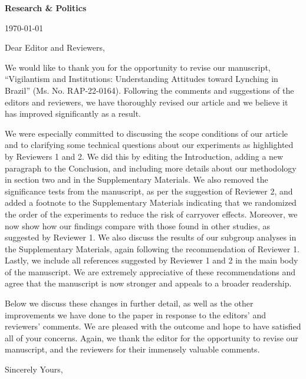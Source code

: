 \documentclass[a4paper,12pt]{article}
\begin{document}
\doublespacing

\noindent \textbf{Research \& Politics}

\noindent \today 

\vspace{.5cm}

\noindent Dear Editor and Reviewers,

\vspace{.5cm}

We would like to thank you for the opportunity to revise our manuscript,
``Vigilantism and Institutions: Understanding Attitudes toward Lynching in
Brazil'' (Ms. No. RAP-22-0164). Following the comments and suggestions of the
editors and reviewers, we have thoroughly revised our article and we believe it
has improved significantly as a result. 

We were especially committed to discussing the scope conditions of our article
and to clarifying some technical questions about our experiments as highlighted
by Reviewers 1 and 2. We did this by editing the Introduction, adding a new
paragraph to the Conclusion, and including more details about our methodology
in section two and in the Supplementary Materials. We also removed the
significance tests from the manuscript, as per the suggestion of Reviewer 2,
and added a footnote to the Supplementary Materials indicating that we
randomized the order of the experiments to reduce the risk of carryover
effects. Moreover, we now show how our findings compare with those found in
other studies, as suggested by Reviewer 1. We also discuss the results of our
subgroup analyses in the Supplementary Materials, again following the
recommendation of Reviewer 1. Lastly, we include all references suggested by
Reviewer 1 and 2 in the main body of the manuscript. We are extremely
appreciative of these recommendations and agree that the manuscript is now
stronger and appeals to a broader readership.

Below we discuss these changes in further detail, as well as the other
improvements we have done to the paper in response to the editors' and
reviewers' comments. We are pleased with the outcome and hope to have satisfied
all of your concerns. Again, we thank the editor for the opportunity to revise
our manuscript, and the reviewers for their immensely valuable comments.

\vspace{.5cm}

\noindent Sincerely Yours,

\vspace{.5cm}
\end{document}
